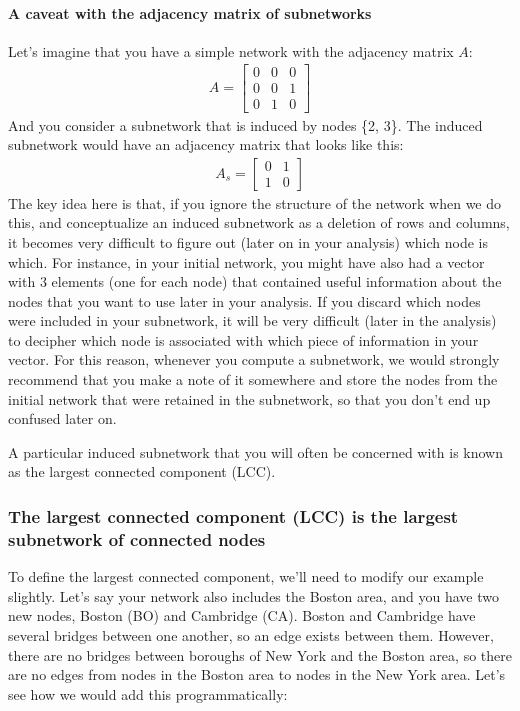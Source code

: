 \paragraph*{A caveat with the adjacency matrix of subnetworks}
Let's imagine that you have a simple network with the adjacency matrix $A$:
\begin{align*}
    A = \begin{bmatrix}
        0 & 0 & 0 \\
        0 & 0 & 1 \\
        0 & 1 & 0
    \end{bmatrix}
\end{align*}
And you consider a subnetwork that is induced by nodes \{2, 3\}. The induced subnetwork would have an adjacency matrix that looks like this:
\begin{align*}
    A_s = \begin{bmatrix}
        0 & 1 \\
        1 & 0
    \end{bmatrix}
\end{align*}
The key idea here is that, if you ignore the structure of the network when we do this, and conceptualize an induced subnetwork as a {deletion} of rows and columns, it becomes very difficult to figure out (later on in your analysis) which node is which. For instance, in your initial network, you might have also had a vector with $3$ elements (one for each node) that contained useful information about the nodes that you want to use later in your analysis. If you discard which nodes were included in your subnetwork, it will be very difficult (later in the analysis) to decipher which node is associated with which piece of information in your vector. For this reason, whenever you compute a subnetwork, we would {strongly} recommend that you make a note of it somewhere and store the nodes from the initial network that were retained in the subnetwork, so that you don't end up confused later on.

A particular induced subnetwork that you will often be concerned with is known as the largest connected component (LCC). 


\subsubsection{The largest connected component (LCC) is the largest subnetwork of connected nodes}
\label{sec:ch4:prop-net:lcc}
To define the largest connected component, we'll need to modify our example slightly. Let's say your network also includes the Boston area, and you have two new nodes, Boston (BO) and Cambridge (CA). Boston and Cambridge have several bridges between one another, so an edge exists between them. However, there are no bridges between boroughs of New York and the Boston area, so there are no edges from nodes in the Boston area to nodes in the New York area. Let's see how we would add this programmatically:

